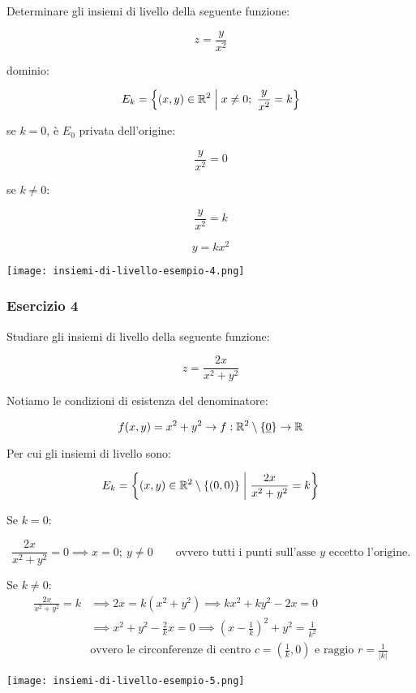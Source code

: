 Determinare gli insiemi di livello della seguente funzione:

\[
    z= \frac{y}{x^{2}}
\]

dominio:

\[
    E_k = \left\{(x,y) \in \R^{2} \giventhat[\Big] x \neq  0;\ \frac{y}{x^{2}}=k \right\}
\]

se \(k=0\), è \(E_0\) privata dell'origine:

\[
    \frac{y}{x^{2}}=0
\]

se \(k \ne 0\):

\[
    \frac{y}{x^{2}} = k
\]

\[
    y = kx^{2}
\]

\vspace{5mm}
\begin{center}
    \texttt{[image: insiemi-di-livello-esempio-4.png]}
\end{center}

\filbreak{}
\subsubsection*{Esercizio 4}

Studiare gli insiemi di livello della seguente funzione:

\[
    z = \frac{2x}{x^2+y^2}
\]

Notiamo le condizioni di esistenza del denominatore:

\[f(x,y) = x^2 + y^2 \to f: \R^2 \setminus \{\uzero \} \to \R \]

Per cui gli insiemi di livello sono:

\[E_k = \left\{ (x,y) \in \R^2 \setminus \{(0,0)\} \giventhat[\bigg] \frac{2x}{x^2+y^2} = k \right\} \]

Se \(k=0\):

\[
    \frac{2x}{x^2+y^2} = 0 \implies x = 0;\ y \ne 0 \qquad \text{ovvero tutti i punti sull'asse \(y\) eccetto l'origine.}
\]

Se \(k \ne 0\):
\begin{align*}
    \frac{2x}{x^2+y^2} = k & \implies 2x = k (x^2+y^2) \implies kx^2 + ky^2 -2x = 0                                                        \\
                           & \implies x^2 + y^2 -\frac{2}{k}x = 0 \implies {\left( x-\frac{1}{k} \right)}^2 + y^2 = \frac{1}{k^2}          \\
                           & \text{ovvero le circonferenze di centro } c=\left( \frac{1}{k}, 0 \right) \text{ e raggio } r = \frac{1}{|k|}
\end{align*}
\begin{center}
    \texttt{[image: insiemi-di-livello-esempio-5.png]}
\end{center}

